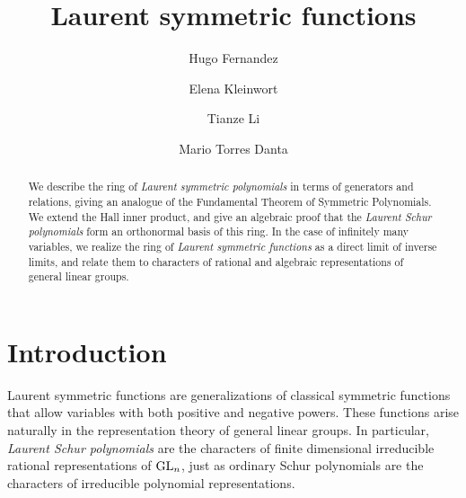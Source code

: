 \documentclass[11pt]{amsart}
\begin{document}
\title{Laurent symmetric functions} 

\author{Hugo Fernandez}
\address[H.F.]{%
    Facultad de CC. Matemáticas \\
    Universidad Complutense de Madrid	 \\
     Pl. de las Ciencias, 3, 28040 Madrid, Spain
}


\author{Elena Kleinwort}
\address[E.K.]{%
    Department of Mathematics\\
    University of Hamburg \\
    20146 Hamburg, Germany
}


\author{Tianze Li}
\address[T.L.]{%
    Department of Mathematics \\
    University of California \\
    Berkeley, CA 94720, United States
}


\author{Mario Torres Danta}
\address[M.T.D.]{%
    Facultad de Matemáticas \\
     Universidad de Sevilla \\
   Calle Tarfia, 41012 Sevilla, Spain
}




\begin{abstract}
    We describe the ring of \textit{Laurent symmetric polynomials} in terms of generators and relations, giving an analogue of the Fundamental Theorem of Symmetric  Polynomials. We extend the Hall inner product, and give an algebraic proof that the \textit{Laurent Schur polynomials} form an orthonormal basis of this ring. In the case of infinitely many variables, we realize the ring of \textit{Laurent symmetric functions} as a direct limit of inverse limits, and relate them to characters of rational and algebraic representations of general linear groups.
\end{abstract}

\maketitle
\thispagestyle{empty}

\tableofcontents

\section{Introduction}
Laurent symmetric functions are generalizations of classical symmetric functions that allow variables with both positive and negative powers. These functions arise naturally in the representation theory of general linear groups. In particular, \textit{Laurent Schur polynomials} are the characters of finite dimensional irreducible rational representations of $\mathrm{GL}_n$, just as ordinary Schur polynomials are the characters of irreducible polynomial representations.
\end{document}
